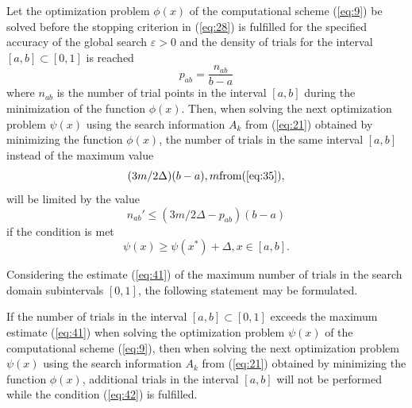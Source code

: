 \documentclass[smallextended]{svjour3}       %
\begin{document}
\begin{theorem}
Let the optimization problem $\phi(x)$ of the computational scheme (\ref{eq:9}) be solved before the stopping criterion in (\ref{eq:28}) is fulfilled for the specified accuracy of the global search $\varepsilon > 0$ and the density of trials for the interval $[a,b] \subset [0,1]$ is reached
\begin{equation}\label{eq:39}
p_{ab}=\frac{n_{ab}}{b-a}
\end{equation}
where $n_{ab}$ is the number of trial points in the interval $[a,b]$ during the minimization of the function $\phi(x)$. Then, when solving the next optimization problem $\psi(x)$ using the search information $A_k$ from (\ref{eq:21}) obtained by minimizing the function $\phi(x)$, the number of trials in the same interval $[a,b]$ instead of the maximum value
\begin{equation}\label{eq:40}
(3m/2\Delta)(b-a), m \text{from} (\ref{eq:35}),
\end{equation}
will be limited by the value
\begin{equation}\label{eq:41}
n_{ab}' \leq (3m/2\Delta - p_{ab})(b-a)
\end{equation}
if the condition is met
\begin{equation}\label{eq:42}
\psi(x) \geq \psi(x^*)+\Delta, x \in [a,b].
\end{equation}
\end{theorem}

Considering the estimate (\ref{eq:41}) of the maximum number of trials in the search domain subintervals $[0,1]$, the following statement may be formulated.

\begin{theorem}
If the number of trials in the interval $[a,b]\subset[0,1]$ exceeds the maximum estimate (\ref{eq:41}) when solving the optimization problem $\psi(x)$ of the computational scheme (\ref{eq:9}), then when solving the next optimization problem $\psi(x)$ using the search information $A_k$ from (\ref{eq:21}) obtained by minimizing the function $\phi(x)$, additional trials in the interval $[a,b]$ will not be performed while the condition (\ref{eq:42}) is fulfilled.
\end{theorem}
\end{document}
